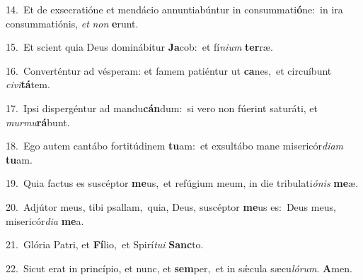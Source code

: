 {\numbfont\textcolor{\numbcolor}{14.}}~Et de exsecratióne et mendácio annuntiabúntur in consummati\-\textbf{ó}\-ne:~\star in ira consummatiónis, \textit{et} \textit{non} \textbf{e}\-runt.\par
{\numbfont\textcolor{\numbcolor}{15.}}~Et scient quia Deus dominábitur \textbf{Ja}\-cob:~\star et fí\-\textit{ni}\-\textit{um} \textbf{ter}\-ræ.\par
{\numbfont\textcolor{\numbcolor}{16.}}~Converténtur ad vésperam: et famem patiéntur ut \textbf{ca}\-nes,~\star et circuíbunt \textit{ci}\-\textit{vi}\textbf{tá}tem.\par
{\numbfont\textcolor{\numbcolor}{17.}}~Ipsi dispergéntur ad mandu\-\textbf{cán}\-dum:~\star si vero non fúerint saturáti, et \textit{mur}\-\textit{mu}\textbf{rá}bunt.\par
{\numbfont\textcolor{\numbcolor}{18.}}~Ego autem cantábo fortitúdinem \textbf{tu}\-am:~\star et exsultábo mane misericór\-\textit{di}\-\textit{am} \textbf{tu}\-am.\par
{\numbfont\textcolor{\numbcolor}{19.}}~Quia factus es suscéptor \textbf{me}\-us,~\star et refúgium meum, in die tribulati\-\textit{ó}\-\textit{nis} \textbf{me}\-æ.\par
{\numbfont\textcolor{\numbcolor}{20.}}~Adjútor meus, tibi psallam,~\dagger quia, Deus, suscéptor \textbf{me}\-us es:~\star Deus meus, misericór\-\textit{di}\-\textit{a} \textbf{me}\-a.\par
{\numbfont\textcolor{\numbcolor}{21.}}~Glória Patri, et \textbf{Fí}\-lio,~\star et Spirí\-\textit{tu}\-\textit{i} \textbf{Sanc}\-to.\par
{\numbfont\textcolor{\numbcolor}{22.}}~Sicut erat in princípio, et nunc, et \textbf{sem}\-per,~\star et in sǽcula sæcu\-\textit{ló}\-\textit{rum}. \textbf{A}\-men.\par
